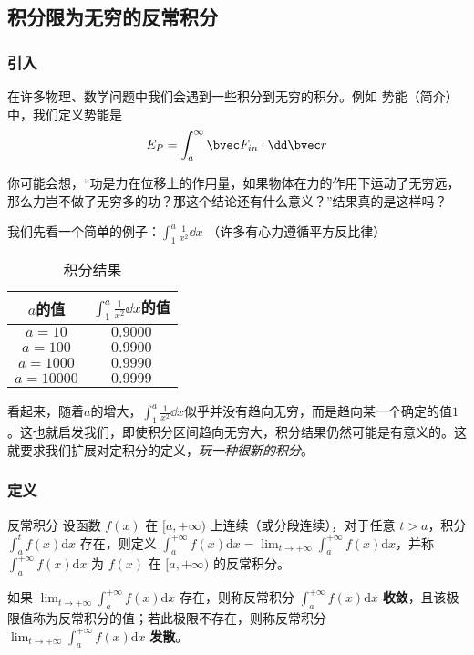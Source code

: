\begin{issues}
\issueTODO
\issueDraft
\end{issues}

\subsection{积分限为无穷的反常积分}

\subsubsection{引入}
在许多物理、数学问题中我们会遇到一些积分到无穷的积分。例如 势能（简介） 中，我们定义势能是
$$E_P=\int ^\infty_a \bvec F_{in} \cdot \dd \bvec r$$

你可能会想，“功是力在位移上的作用量，如果物体在力的作用下运动了无穷远，那么力岂不做了无穷多的功？那这个结论还有什么意义？”结果真的是这样吗？

我们先看一个简单的例子：$\int^a_1 \frac{1}{x^2} \dd x$ （许多有心力遵循平方反比律）

\begin{table}[ht]
\centering
\caption{积分结果}\label{impro_tab1}
\begin{tabular}{|c|c|}
\hline
$a$的值 & $\int^a_1 \frac{1}{x^2} \dd x$的值 \\
\hline
$a=10$ & $0.9000$ \\
\hline
$a=100$ & $0.9900$ \\
\hline
$a=1000$ & $0.9990$ \\
\hline
$a=10000$& $0.9999$\\
\hline
\end{tabular}
\end{table}
看起来，随着$a$的增大，$\int^a_1 \frac{1}{x^2} \dd x$似乎并没有趋向无穷，而是趋向某一个确定的值$1$。这也就启发我们，即使积分区间趋向无穷大，积分结果仍然可能是有意义的。这就要求我们扩展对定积分的定义，\textsl{玩一种很新的积分}。

\subsubsection{定义}
\begin{definition}{反常积分}
设函数 $f(x)$ 在 $[a, +\infty)$ 上连续（或分段连续），对于任意 $t>a$，积分 $\displaystyle \int^t_af(x)\mathrm{d} x$ 存在，则定义 $\displaystyle \int ^{+\infty}_a f(x)\mathrm{d} x=\lim_{t\rightarrow+\infty }\int _a^{+\infty}f(x)\mathrm{d} x$，并称 $\displaystyle \int ^{+\infty}_a f(x)\mathrm{d} x $ 为 $f(x)$ 在 $[a, +\infty)$ 的反常积分。

如果 $\displaystyle \lim_{t\rightarrow+\infty }\int _a^{+\infty}f(x)\mathrm{d} x$ 存在，则称反常积分 $\displaystyle \int ^{+\infty}_a f(x)\mathrm{d} x$ \textbf{收敛}，且该极限值称为反常积分的值；若此极限不存在，则称反常积分 $\displaystyle \lim_{t\rightarrow+\infty }\int _a^{+\infty}f(x)\mathrm{d} x$ \textbf{发散}。
\end{definition}

